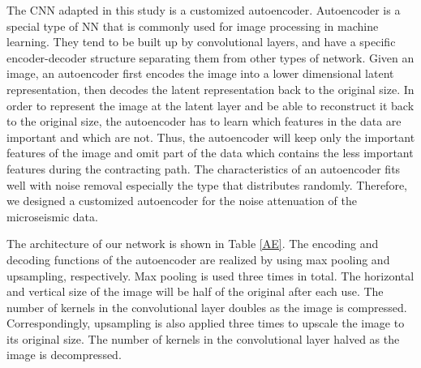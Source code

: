 \documentclass[a4paper]{article}
\begin{document}
The CNN adapted in this study is a customized autoencoder. Autoencoder is a special type of NN that is commonly used for image processing in machine learning. They tend to be built up by convolutional layers, and have a specific encoder-decoder structure separating them from other types of network. Given an image, an autoencoder first encodes the image into a lower dimensional latent representation, then decodes the latent representation back to the original size. In order to represent the image at the latent layer and be able to reconstruct it back to the original size, the autoencoder has to learn which features in the data are important and which are not. Thus, the autoencoder will keep only the important features of the image and omit part of the data which contains the less important features during the contracting path. The characteristics of an autoencoder fits well with noise removal especially the type that distributes randomly. Therefore, we designed a customized autoencoder for the noise attenuation of the microseismic data. 

The architecture of our network is shown in Table \ref{AE}. The encoding and decoding functions of the autoencoder are realized by using max pooling and upsampling, respectively. Max pooling is used three times in total. The horizontal and vertical size of the image will be half of the original after each use. The number of kernels in the convolutional layer doubles as the image is compressed. Correspondingly, upsampling is also applied three times to upscale the image to its original size. The number of kernels in the convolutional layer halved as the image is decompressed. 
\end{document}
